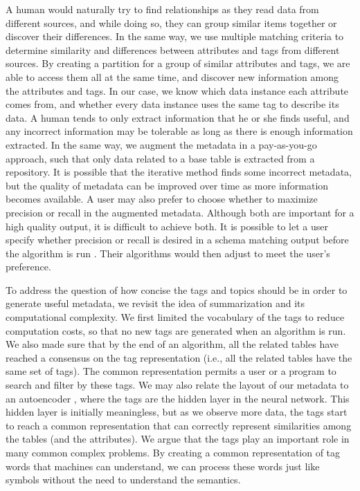 A human would naturally try to find relationships as they read data from different sources, and while doing so, they can group similar items together or discover their differences. In the same way, we use multiple matching criteria to determine similarity and differences between attributes and tags from different sources. By creating a partition for a group of similar attributes and tags, we are able to access them all at the same time, and discover new information among the attributes and tags. In our case, we know which data instance each attribute comes from, and whether every data instance uses the same tag to describe its data. A human tends to only extract information that he or she finds useful, and any incorrect information may be tolerable as long as there is enough information extracted. In the same way, we augment the metadata in a pay-as-you-go approach, such that only data related to a base table is extracted from a repository. It is possible that the iterative method finds some incorrect metadata, but the quality of metadata can be improved over time as more information becomes available. A user may also prefer to choose whether to maximize precision or recall in the augmented metadata. Although both are important for a high quality output, it is difficult to achieve both. It is possible to let a user specify whether precision or recall is desired in a schema matching output before the algorithm is run \cite{Duchateau2009YAM}. Their algorithms would then adjust to meet the user's preference.

To address the question of how concise the tags and topics should be in order to generate useful metadata, we revisit the idea of summarization and its computational complexity. We first limited the vocabulary of the tags to reduce computation costs, so that no new tags are generated when an algorithm is run. We also made sure that by the end of an algorithm, all the related tables have reached a consensus on the tag representation (i.e., all the related tables have the same set of tags). The common representation permits a user or a program to search and filter by these tags. We may also relate the layout of our metadata to an autoencoder \cite{kipf2017semisupervised}, where the tags are the hidden layer in the neural network. This hidden layer is initially meaningless, but as we observe more data, the tags start to reach a common representation that can correctly represent similarities among the tables (and the attributes). We argue that the tags play an important role in many common complex problems. By creating a common representation of tag words that machines can understand, we can process these words just like symbols without the need to understand the semantics.


